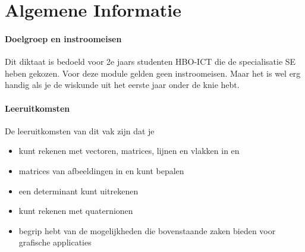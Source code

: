 


\chapter{Algemene Informatie}
\label{chap:algemeneinformatie}

\subsubsection{Doelgroep en instroomeisen}
Dit diktaat is bedoeld voor 2e jaars studenten HBO-ICT die de specialisatie SE heben gekozen. Voor deze module gelden geen instroomeisen. Maar het is wel erg handig als je de wiskunde uit het eerste jaar onder de knie hebt.

\subsubsection*{Leeruitkomsten}
De leeruitkomsten van dit vak zijn dat je
\begin{itemize}
        \setlength\itemsep{-1pt}
        \item kunt rekenen met vectoren, matrices, lijnen en vlakken  in \RT en \RD
        \item matrices van afbeeldingen in \RT en \RD kunt bepalen
        \item een determinant kunt uitrekenen
        \item kunt rekenen met quaternionen
        \item begrip hebt van de mogelijkheden die bovenstaande zaken bieden voor grafische applicaties
        \newline
    \end{itemize}

